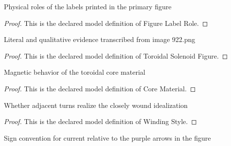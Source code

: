 \begin{definition}
  \label{def:physics:phyx-mini-0922:phyxminiproblems-problemphyxmini0922-figurelabelrole}
  Physical roles of the labels printed in the primary figure
\end{definition}
\begin{proof}
  This is the declared model definition of Figure Label Role.
\end{proof}
\begin{definition}
  \label{def:physics:phyx-mini-0922:phyxminiproblems-problemphyxmini0922-toroidalsolenoidfigure}
  Literal and qualitative evidence transcribed from image 922.png
\end{definition}
\begin{proof}
  This is the declared model definition of Toroidal Solenoid Figure.
\end{proof}
\begin{definition}
  \label{def:physics:phyx-mini-0922:phyxminiproblems-problemphyxmini0922-corematerial}
  Magnetic behavior of the toroidal core material
\end{definition}
\begin{proof}
  This is the declared model definition of Core Material.
\end{proof}
\begin{definition}
  \label{def:physics:phyx-mini-0922:phyxminiproblems-problemphyxmini0922-windingstyle}
  Whether adjacent turns realize the closely wound idealization
\end{definition}
\begin{proof}
  This is the declared model definition of Winding Style.
\end{proof}
\begin{definition}
  \label{def:physics:phyx-mini-0922:phyxminiproblems-problemphyxmini0922-currentorientation}
  Sign convention for current relative to the purple arrows in the figure
\end{definition}
